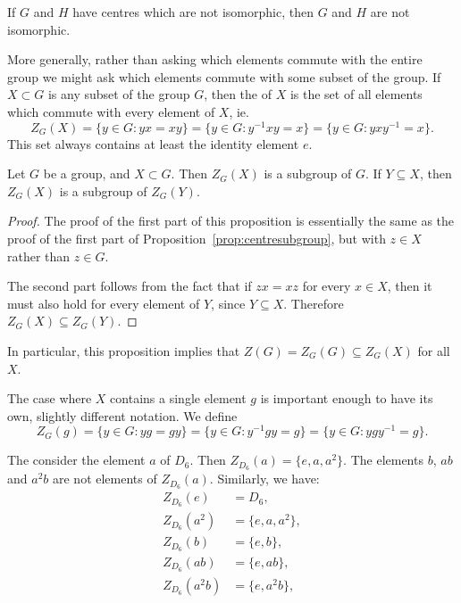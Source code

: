 \begin{corollary}
  If $G$ and $H$ have centres which are not isomorphic, then $G$ and $H$ are
  not isomorphic.
\end{corollary}

More generally, rather than asking which elements commute with the entire
group we might ask which elements commute with some subset of the group.
If $X \subset G$ is any subset of the group $G$,
then the  of $X$ is the set of all elements 
which commute with every element of $X$, ie.
\[
  Z_{G}(X) = \{y \in G : yx = xy\} = \{y \in G : y^{-1}xy = x\} =
  \{y \in G : yxy^{-1} = x\}.
\]
This set always contains at least the identity element $e$.

\begin{proposition}
  Let $G$ be a group, and $X \subset G$.  Then $Z_{G}(X)$ is a
  subgroup of $G$.  If $Y \subseteq X$, then $Z_{G}(X)$ is a subgroup of
  $Z_{G}(Y)$.
\end{proposition}
\begin{proof}
  The proof of the first part of this proposition is essentially the same
  as the proof of the first part of Proposition~\ref{prop:centresubgroup}, but
  with $z \in X$ rather than $z \in G$.
  
  The second part follows from the fact that if $zx = xz$ for every $x \in
  X$, then it must also hold for every element of $Y$, since $Y \subseteq
  X$.  Therefore $Z_{G}(X) \subseteq Z_{G}(Y)$.
\end{proof}

In particular, this proposition implies that $Z(G) = Z_{G}(G) \subseteq
Z_{G}(X)$ for all $X$.

The case where $X$ contains a single element $g$ is important enough to have
its own, slightly different notation.  We define
\[
  Z_{G}(g) = \{y \in G : yg = gy\} = \{y \in G : y^{-1}gy = g\} =
  \{y \in G : ygy^{-1} = g\}.
\]

\begin{example}
  The consider the element $a$ of $D_{6}$.  Then $Z_{D_{6}}(a) = \{e, 
  a, a^{2}\}$.  The elements $b$, $ab$ and $a^{2}b$ are not elements 
  of $Z_{D_{6}}(a)$.  Similarly, we have:
  \begin{align*}
    Z_{D_{6}}(e) &= D_{6},\\
    Z_{D_{6}}(a^{2}) &= \{e, a, a^{2}\},\\
    Z_{D_{6}}(b) &= \{e, b\},\\
    Z_{D_{6}}(ab) &= \{e, ab\},\\
    Z_{D_{6}}(a^{2}b) &= \{e, a^{2}b\},\\
  \end{align*}
\end{example}

